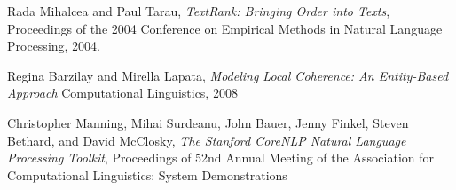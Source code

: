 \documentclass[11pt]{article}
\begin{document}
	\begin{thebibliography}{}
		
		Rada Mihalcea and Paul Tarau,
		\textit{TextRank: Bringing Order into Texts},
		Proceedings of the 2004 Conference on Empirical Methods in Natural Language Processing,
		2004.
		
		Regina Barzilay and Mirella Lapata,
		\textit{Modeling Local Coherence: An Entity-Based Approach}
		Computational Linguistics, 
		2008
		
		Christopher Manning, Mihai Surdeanu, John Bauer, Jenny Finkel, Steven Bethard, and David McClosky,
		\textit{The Stanford CoreNLP Natural Language Processing Toolkit},
		Proceedings of 52nd Annual Meeting of the Association for Computational Linguistics: System Demonstrations
	\end{thebibliography}
	
\end{document}
